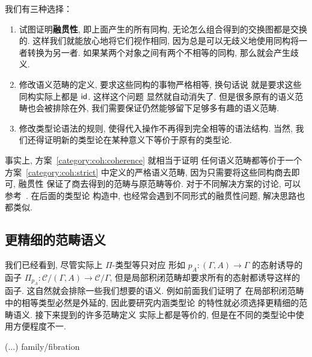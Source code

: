 我们有三种选择：
\begin{enumerate}
\item\label{category:coh:coherence} 试图证明\textbf{融贯性},
即上面产生的所有同构, 无论怎么组合得到的交换图都是交换的.
这样我们就能放心地将它们视作相同,
因为总是可以无歧义地使用同构将一者转换为另一者.
如果某两个对象之间有两个不相等的同构, 那么就会产生歧义.
\item\label{category:coh:strict} 修改语义范畴的定义,
要求这些同构的事物严格相等, 换句话说
就是要求这些同构实际上都是 \(\textnormal{\textsf{id}}\). 这样这个问题
显然就自动消失了. 但是很多原有的语义范畴也会被排除在外,
我们需要保证仍然能够留下足够多有趣的语义范畴.
\item\label{category:coh:weak} 修改类型论语法的规则,
使得代入操作不再得到完全相等的语法结构. 当然,
我们还得证明新的类型论在某种意义下等价于原有的类型论.
\end{enumerate}
事实上, 方案~\ref{category:coh:coherence} 就相当于证明
任何语义范畴都等价于一个方案~\ref{category:coh:strict}
中定义的严格语义范畴, 因为只需要将这些同构商去即可, 融贯性
保证了商去得到的范畴与原范畴等价. 对于不同解决方案的讨论,
可以参考~\cite{curien:2014:revisit}. 在后面的类型论
构造中, 也经常会遇到不同形式的融贯性问题, 解决思路也都类似.

\subsection{更精细的范畴语义}\label{category:better}
我们已经看到, 尽管实际上 \(\Pi\)-类型等只对应
形如 \(p_A : (\Gamma, A) \to \Gamma\) 的态射诱导的
函子 \(\Pi_{p_A} : \mathcal C/(\Gamma, A) \to \mathcal C/\Gamma\),
但是局部积闭范畴却要求所有的态射都诱导这样的函子.
这自然就会排除一些我们想要的语义. 例如前面我们证明了
在局部积闭范畴中的相等类型必然是外延的, 因此要研究内涵类型论
的特性就必须选择更精细的范畴语义. 接下来提到的许多范畴定义
实际上都是等价的, 但是在不同的类型论中使用方便程度不一.

(...) family/fibration

